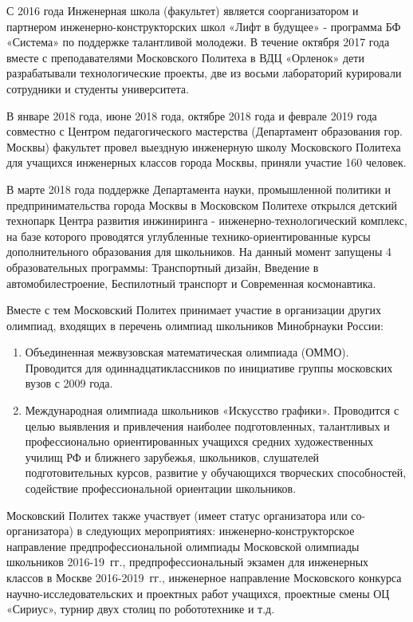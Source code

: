 С 2016 года Инженерная школа (факультет) является соорганизатором и партнером инженерно-конструкторских школ «Лифт в будущее» - программа БФ «Система» по поддержке талантливой молодежи. В течение октября 2017 года вместе с преподавателями Московского Политеха в ВДЦ «Орленок» дети разрабатывали технологические проекты, две из восьми лабораторий курировали сотрудники и студенты университета.

В январе 2018 года, июне 2018 года, октябре 2018 года и феврале 2019 года совместно с Центром педагогического мастерства (Департамент образования гор. Москвы) факультет провел выездную инженерную школу Московского Политеха для учащихся инженерных классов города Москвы, приняли участие 160 человек.

В марте 2018 года поддержке Департамента науки, промышленной политики и предпринимательства города Москвы в Московском Политехе открылся детский технопарк Центра развития инжиниринга - инженерно-технологический комплекс, на базе которого проводятся углубленные технико-ориентированные курсы дополнительного образования для школьников. На данный момент запущены 4 образовательных программы: Транспортный дизайн, Введение в автомобилестроение, Беспилотный транспорт и Современная космонавтика.

Вместе с тем Московский Политех принимает участие в организации других олимпиад, входящих в перечень олимпиад школьников Минобрнауки России:
\begin{enumerate}
    \item Объединенная межвузовская математическая олимпиада (ОММО). Проводится для одиннадцатиклассников по инициативе группы московских вузов с 2009 года.
    \item Международная олимпиада школьников «Искусство графики». Проводится с целью выявления и привлечения наиболее подготовленных, талантливых и профессионально ориентированных учащихся средних художественных училищ РФ и ближнего зарубежья, школьников, слушателей подготовительных курсов, развитие у обучающихся творческих способностей, содействие профессиональной ориентации школьников.
\end{enumerate}

Московский Политех также участвует (имеет статус организатора или со-\linebreak организатора) в следующих мероприятиях: инженерно-конструкторское направление предпрофессиональной олимпиады Московской олимпиады школьников 2016-19~гг., предпрофессиональный экзамен для инженерных классов в Москве 2016-2019~гг., инженерное направление Московского конкурса научно-исследовательских и проектных работ учащихся, проектные смены ОЦ «Сириус», турнир двух столиц по робототехнике и т.д.

